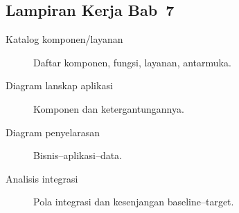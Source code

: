 \subsection*{Lampiran Kerja Bab~7}
\begin{description}
  \item[Katalog komponen/layanan] Daftar komponen, fungsi, layanan, antarmuka.
  \item[Diagram lanskap aplikasi] Komponen dan ketergantungannya.
  \item[Diagram penyelarasan] Bisnis--aplikasi--data.
  \item[Analisis integrasi] Pola integrasi dan kesenjangan baseline--target.
\end{description}
\setlength{\emergencystretch}{0pt}

